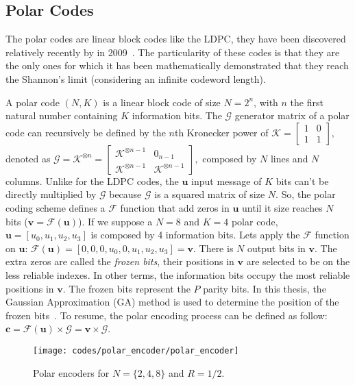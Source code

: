 \subsection{Polar Codes}

The polar codes are linear block codes like the LDPC, they have been discovered
relatively recently by \Arikan in 2009~\cite{Arikan2009}. The particularity of
these codes is that they are the only ones for which it has been mathematically
demonstrated that they reach the Shannon's limit (considering an infinite
codeword length).

A polar code $(N,K)$ is a linear block code of size $N = 2^n$, with $n$ the
first natural number containing $K$ information bits. The $\bm{\mathcal{G}}$
generator matrix of a polar code can recursively be defined by the $n$th
Kronecker power of
$\bm{\mathcal{K}} =
\begin{bmatrix}
1 & 0 \\
1 & 1
\end{bmatrix},$
denoted as
$
\bm{\mathcal{G}} = \bm{\mathcal{K}}^{\otimes n} =
\begin{bmatrix}
\bm{\mathcal{K}}^{\otimes n-1} & 0_{n -1} \\
\bm{\mathcal{K}}^{\otimes n-1} & \bm{\mathcal{K}}^{\otimes n-1}
\end{bmatrix},
$
composed by $N$ lines and $N$ columns. Unlike for the LDPC codes, the $\bm{u}$
input message of $K$ bits can't be directly multiplied by $\bm{\mathcal{G}}$
because $\bm{\mathcal{G}}$ is a squared matrix of size $N$. So, the polar
coding scheme defines a $\mathcal{F}$ function that add zeros in $\bm{u}$ until
it size reaches $N$ bits ($\bm{v} = \mathcal{F}(\bm{u})$). If we suppose a
$N = 8$ and $K = 4$ polar code, $\bm{u} = [u_0, u_1, u_2, u_3]$ is composed by
4 information bits. Lets apply the $\mathcal{F}$ function on $\bm{u}$:
$\mathcal{F}(\bm{u}) = [0, 0, 0, u_0, 0, u_1, u_2, u_3] = \bm{v}$. There is $N$
output bits in $\bm{v}$. The extra zeros are called the \emph{frozen bits},
their positions in $\bm{v}$ are selected to be on the less reliable indexes. In
other terms, the information bits occupy the most reliable positions in
$\bm{v}$. The frozen bits represent the $P$ parity bits. In this thesis, the
Gaussian Approximation (GA) method is used to determine the position of the
frozen bits~\cite{Trifonov2012}. To resume, the polar encoding process can be
defined as follow: $\bm{c} = \mathcal{F}(\bm{u}) \times \bm{\mathcal{G}} =
\bm{v} \times \bm{\mathcal{G}}$.

\begin{figure}[htp]
  \centering
  \texttt{[image: codes/polar\_encoder/polar\_encoder]}
  \caption{Polar encoders for $N = \{2, 4, 8\}$ and $R = 1/2$.}
  \label{fig:ctx_codes_polar_encoder}
\end{figure}

